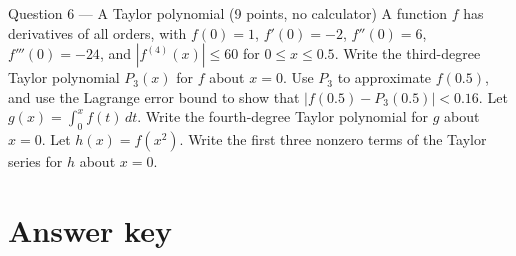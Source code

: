 \documentclass{apcalc}
\begin{document}
\begin{frq}{Question 6 --- A Taylor polynomial (9 points, no calculator)}
A function $f$ has derivatives of all orders, with $f(0)=1$, $f'(0)=-2$, $f''(0)=6$, $f'''(0)=-24$, and $|f^{(4)}(x)|\le60$ for $0\le x\le0.5$.
Write the third-degree Taylor polynomial $P_3(x)$ for $f$ about $x=0$.\workspace{1.6in}
Use $P_3$ to approximate $f(0.5)$, and use the Lagrange error bound to show that $|f(0.5)-P_3(0.5)|<0.16$.\workspace{1.6in}
Let $g(x)=\int_0^xf(t)\,dt$. Write the fourth-degree Taylor polynomial for $g$ about $x=0$.\workspace{1.6in}
Let $h(x)=f(x^2)$. Write the first three nonzero terms of the Taylor series for $h$ about $x=0$.\workspace{1.6in}
\end{frq}
\clearpage\section*{Answer key}
\vspace{4pt}
\end{document}
